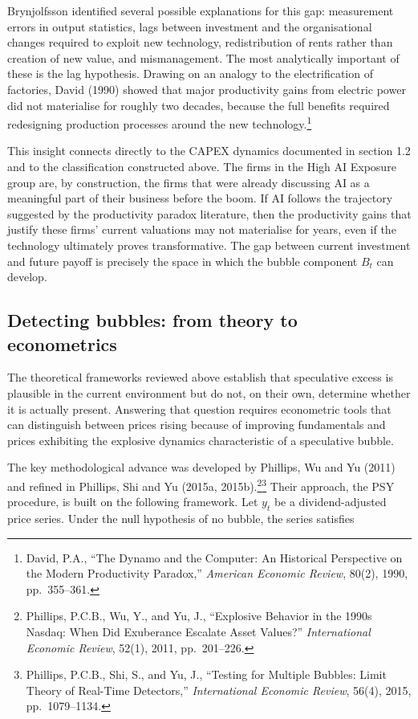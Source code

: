 \documentclass[12pt,a4paper]{article}
\begin{document}
Brynjolfsson identified several possible explanations for this gap: measurement errors in output statistics, lags between investment and the organisational changes required to exploit new technology, redistribution of rents rather than creation of new value, and mismanagement. The most analytically important of these is the lag hypothesis. Drawing on an analogy to the electrification of factories, David (1990) showed that major productivity gains from electric power did not materialise for roughly two decades, because the full benefits required redesigning production processes around the new technology.\footnote{David, P.A., ``The Dynamo and the Computer: An Historical Perspective on the Modern Productivity Paradox,'' \textit{American Economic Review}, 80(2), 1990, pp.\ 355--361.}

This insight connects directly to the CAPEX dynamics documented in section 1.2 and to the classification constructed above. The firms in the High AI Exposure group are, by construction, the firms that were already discussing AI as a meaningful part of their business before the boom. If AI follows the trajectory suggested by the productivity paradox literature, then the productivity gains that justify these firms' current valuations may not materialise for years, even if the technology ultimately proves transformative. The gap between current investment and future payoff is precisely the space in which the bubble component $B_t$ can develop.

\subsection{Detecting bubbles: from theory to econometrics}

The theoretical frameworks reviewed above establish that speculative excess is plausible in the current environment but do not, on their own, determine whether it is actually present. Answering that question requires econometric tools that can distinguish between prices rising because of improving fundamentals and prices exhibiting the explosive dynamics characteristic of a speculative bubble.

The key methodological advance was developed by Phillips, Wu and Yu (2011) and refined in Phillips, Shi and Yu (2015a, 2015b).\footnote{Phillips, P.C.B., Wu, Y., and Yu, J., ``Explosive Behavior in the 1990s Nasdaq: When Did Exuberance Escalate Asset Values?'' \textit{International Economic Review}, 52(1), 2011, pp.\ 201--226.}\footnote{Phillips, P.C.B., Shi, S., and Yu, J., ``Testing for Multiple Bubbles: Limit Theory of Real-Time Detectors,'' \textit{International Economic Review}, 56(4), 2015, pp.\ 1079--1134.} Their approach, the PSY procedure, is built on the following framework. Let $y_t$ be a dividend-adjusted price series. Under the null hypothesis of no bubble, the series satisfies
\end{document}
